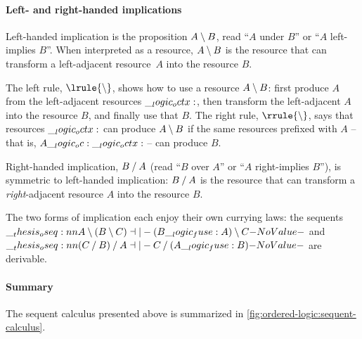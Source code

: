 \paragraph*{Left- and right-handed implications}
Left-handed implication is the proposition $A \mathbin { \setminus } B$, read \enquote{$A$ under $B$} or \enquote{$A$ left-implies $B$}.
When interpreted as a resource, $A \mathbin { \setminus } B$ is the resource that can transform a left-adjacent resource~$A$ into the resource $B$.
The left rule, $\lrule{\limp}$, shows how to use a resource $A \mathbin { \setminus } B$: first produce $A$ from the left-adjacent resources $\__logic_octx:$, then transform the left-adjacent $A$ into the resource $B$, and finally use that $B$.
The right rule, $\rrule{\limp}$, says that resources $\__logic_octx:$ can produce $A \mathbin { \setminus } B$ if the same resources prefixed with $A$ -- that is, $A \__logic_oc: \__logic_octx:$ -- can produce $B$.

Right-handed implication, $B \mathbin { / } A$ (read \enquote{$B$ over $A$} or \enquote{$A$ right-implies $B$}), is symmetric to left-handed implication: $B \mathbin { / } A$ is the resource that can transform a \emph{right}-adjacent resource $A$ into the resource $B$.

The two forms of implication each enjoy their own currying laws: the sequents $\oseq{A \limp (B \limp C) \dashv|- (B \fuse A) \limp C}$ and $\oseq{(C \pmir B) \pmir A \dashv|- C \pmir (A \fuse B)}$ are derivable.


\paragraph*{Summary}
The sequent calculus presented above is summarized in \cref{fig:ordered-logic:sequent-calculus}.

